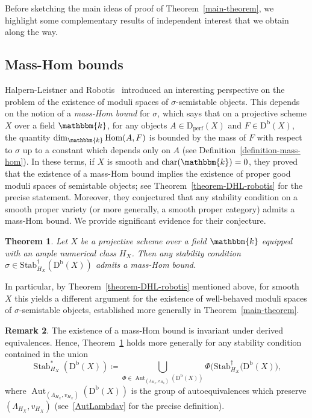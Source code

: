 \documentclass[11pt, reqno]{amsart}
\numberwithin{equation}{section}
\theoremstyle{plain}
\newtheorem{theorem}{Theorem}[section]
\theoremstyle{remark}
\theoremstyle{definition}
\newtheorem{remark}[theorem]{Remark}
\theoremstyle{italicsname}
\newcommand{\Db}{\mathrm{D^b}}
\newcommand{\Dperf}{\mathrm{D}_{\mathrm{perf}}}
\DeclareMathOperator{\Stab}{Stab}
\newcommand{\Stabdagger}{\mathrm{Stab}^\dagger}
\DeclareMathOperator{\Hom}{Hom}
\DeclareMathOperator{\Aut}{Aut}
\newcommand{\KK}{\mathbbm{k}}
\begin{document}
Before sketching the main ideas of proof of Theorem~\ref{main-theorem}, we highlight some complementary results of independent interest that we obtain along the way. 

\subsection{Mass-Hom bounds} 
Halpern-Leistner and Robotis~\cite{DHL-robotis} introduced an interesting perspective on the problem of the existence of moduli spaces of $\sigma$-semistable objects.
This depends on the notion of a \emph{mass-Hom bound} for $\sigma$, which says that on a projective scheme $X$ over a field $\KK$, for any objects $A\in\Dperf(X)$ and $F\in\Db(X)$, the quantity $\dim_\KK \Hom(A,F)$ is bounded by the mass of $F$ with respect to $\sigma$ up to a constant which depends only on $A$ (see Definition~\ref{definition-mass-hom}). 
In these terms, if $X$ is smooth and $\mathrm{char}(\KK)=0$, they proved that the existence of a mass-Hom bound implies the existence of proper good moduli spaces of semistable objects; see Theorem~\ref{theorem-DHL-robotis} for the precise statement. 
Moreover, they conjectured that any stability condition on a smooth proper variety (or more generally, a smooth proper category) admits a mass-Hom bound. 
We provide significant evidence for their conjecture. 

\begin{theorem}\label{thm:MassHomBoundMain}
Let $X$ be a projective scheme over a field $\KK$ equipped with an ample numerical class $H_X$.  
Then any stability condition $\sigma \in \Stabdagger_{H_X}(\Db(X))$ admits a mass-Hom bound. 
\end{theorem}

In particular, by Theorem~\ref{theorem-DHL-robotis} mentioned above, for smooth $X$ this yields a different argument for 
the existence of well-behaved moduli spaces of $\sigma$-semistable objects, established more generally in Theorem~\ref{main-theorem}. 

\begin{remark}
    The existence of a mass-Hom bound is invariant under derived equivalences. Hence,  Theorem~\ref{thm:MassHomBoundMain} holds more generally for any stability condition contained in the union 
    \[
\Stab^\ast_{H_X}(\Db(X))\coloneqq\bigcup\limits_{\scriptstyle\Phi\in \Aut_{(\Lambda_{H_X}, v_{H_X})}(\Db(X))}\Phi\big(\Stabdagger_{H_X}(\Db(X)\big), 
\]
where $\Aut_{(\Lambda_{H_X}, v_{H_X})}(\Db(X))$ is the group of autoequivalences which preserve $(\Lambda_{H_X}, v_{H_X})$ (see~\eqref{AutLambdav} for the precise definition). 
\end{remark}
\end{document}
